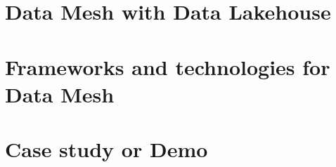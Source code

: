 \documentclass[12pt, a4paper]{book}
\begin{document}
\section{Data Mesh with Data Lakehouse}

\section{Frameworks and technologies for Data Mesh}

\section{Case study or Demo}


\begingroup
\backmatter
{}
\renewcommand\bibname{References}

\endgroup

\clearpage
\end{document}
